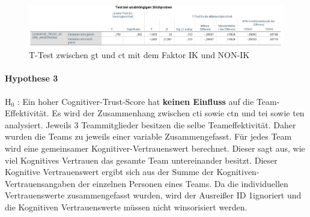 \documentclass[a4paper,11pt]{article}%
\renewcommand{\\}{\vspace*{0.5\baselineskip} \newline}
\begin{document}
\begin{figure}[H]
\centering
		\begin{footnotesize}
			\includegraphics[width=\textwidth]{Abbildungen/Post_QuestionnaireStatistiks/ttest_cti_ctn}
			\caption{T-Test zwischen \ac{gt} und \ac{ct} mit dem Faktor IK und NON-IK}
			\label{fig:ttest_gt_ct}
		\end{footnotesize}
	\end{figure}	

\newpage
\paragraph{Hypothese 3}
H$_{0}$ : Ein hoher Cognitiver-Trust-Score hat \textbf{keinen Einfluss} auf die Team-Effektivität.\\
Es wird der Zusammenhang zwischen \ac{cti} sowie \ac{ctn} und \ac{tei} sowie \ac{ten} analysiert.
Jeweils 3 Teammitglieder besitzen die selbe Teameffektivität. Daher wurden die Teams zu jeweils einer variable Zusammengefasst. Für jedes Team wird eine gemeinsamer Kognitiver-Vertrauenswert berechnet. Dieser sagt aus, wie viel Kognitives Vertrauen das gesamte Team untereinander besitzt. Dieser Kognitive Vertrauenswert ergibt sich aus der Summe der Kognitiven-Vertrauensangaben der einzelnen Personen eines Teams.
Da die individuellen Vertrauenswerte zusammengefasst wurden, wird der Ausreißer \flqq ID 1\frqq ignoriert und die Kognitiven Vertrauenswerte müssen nicht winsorisiert werden.
\end{document}
